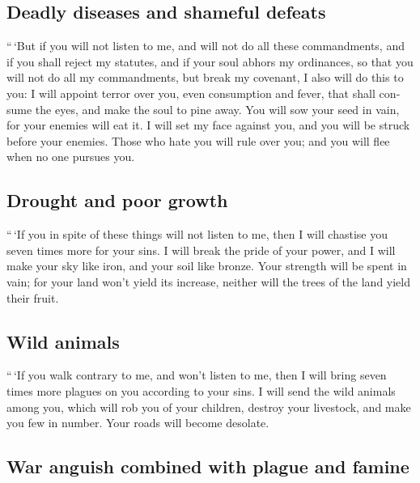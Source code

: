 \begin{paracol}{2}
\begin{otherlanguage}{english}
\hypertarget{deadly-diseases-and-shameful-defeats}{%
\subsection{Deadly diseases and shameful
defeats}\label{deadly-diseases-and-shameful-defeats}}

 ``\,`But if you will not listen to me, and will not do
all these commandments,  and if you shall reject my
statutes, and if your soul abhors my ordinances, so that you will not do
all my commandments, but break my covenant,  I also will
do this to you: I will appoint terror over you, even consumption and
fever, that shall consume the eyes, and make the soul to pine away. You
will sow your seed in vain, for your enemies will eat it.
 I will set my face against you, and you will be struck
before your enemies. Those who hate you will rule over you; and you will
flee when no one pursues you.

\hypertarget{drought-and-poor-growth}{%
\subsection{Drought and poor growth}\label{drought-and-poor-growth}}

 ``\,`If you in spite of these things will not listen to
me, then I will chastise you seven times more for your sins.
 I will break the pride of your power, and I will make
your sky like iron, and your soil like bronze.  Your
strength will be spent in vain; for your land won't yield its increase,
neither will the trees of the land yield their fruit.

\hypertarget{wild-animals}{%
\subsection{Wild animals}\label{wild-animals}}

 ``\,`If you walk contrary to me, and won't listen to me,
then I will bring seven times more plagues on you according to your
sins.  I will send the wild animals among you, which will
rob you of your children, destroy your livestock, and make you few in
number. Your roads will become desolate.

\hypertarget{war-anguish-combined-with-plague-and-famine}{%
\subsection{War anguish combined with plague and
famine}\label{war-anguish-combined-with-plague-and-famine}}


\end{otherlanguage}
\end{paracol}
